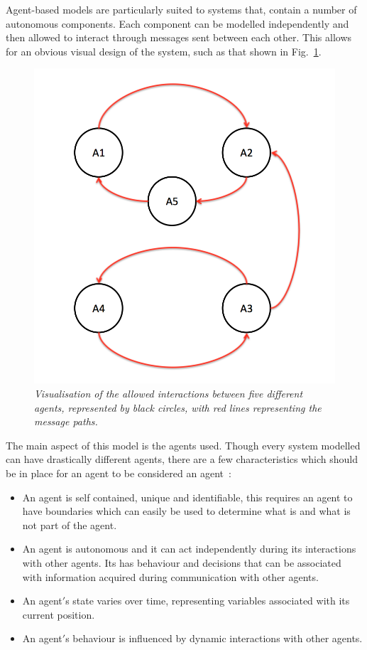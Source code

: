 \documentclass{article}
\begin{document}
Agent-based models are particularly suited to systems that, contain a number of autonomous components. Each component can be modelled independently and then allowed to interact through messages sent between each other. This allows for an obvious visual design of the system, such as that shown in Fig.~\ref{fig:abmii}.
\begin{figure}[H]
	\centering
	\includegraphics[scale=0.5]{abmii}
	\caption{\it Visualisation of the allowed interactions between five different agents, represented by black circles, with red lines representing the message paths.}
	\label{fig:abmii}
\end{figure} 
The main aspect of this model is the agents used. Though every system modelled can have drastically different agents, there are a few characteristics which should be in place for an agent to be considered an agent~\cite{MN2010, abmtsd}:
\begin{itemize}
   \item An agent is self contained, unique and identifiable, this requires an agent to have boundaries which can easily be used to determine what is and what is not part of the agent. 
   \item An agent is autonomous and it can act independently during its interactions with other agents. Its has behaviour and decisions that can be associated with information acquired  during communication with other agents. 
   \item An agent$'$s state varies over time, representing variables associated with its current position. 
   \item An agent$'$s behaviour is influenced by dynamic interactions with other agents. 
\end{itemize}
\end{document}
